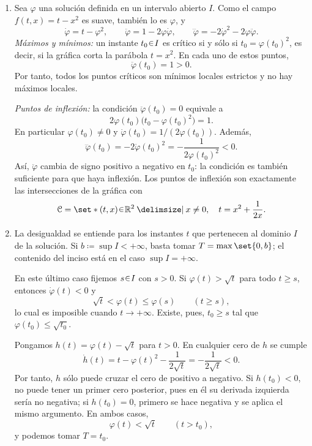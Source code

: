 \begin{sol}
\begin{enumerate}[label = (\alph*)]
    \item Sea $\varphi$ una solución definida en un intervalo abierto $I$. Como el campo $f(t,x)=t-x^2$ es suave, también lo es $\varphi$, y
    \[
        \dot\varphi=t-\varphi^2,\qquad
        \ddot\varphi=1-2\varphi\dot\varphi,\qquad
        \dddot\varphi=-2\dot\varphi^2-2\varphi\ddot\varphi.
    \]
    \emph{Máximos y mínimos:}
    un instante $t_0\en I$ es crítico si y sólo si $t_0=\varphi(t_0)^2$, es decir, si la gráfica corta la parábola $t=x^2$. En cada uno de estos puntos,
    \[
        \ddot\varphi(t_0)=1>0.
    \]
    Por tanto, todos los puntos críticos son mínimos locales estrictos y no hay máximos locales.

    \emph{Puntos de inflexión:}
    la condición $\ddot\varphi(t_0)=0$ equivale a
    \[
        2\varphi(t_0)\big(t_0-\varphi(t_0)^2\big)=1.
    \]
    En particular $\varphi(t_0)\neq0$ y $\dot\varphi(t_0)=1/(2\varphi(t_0))$. Además,
    \[
        \dddot\varphi(t_0)
        =-2\dot\varphi(t_0)^2
        =-\frac{1}{2\varphi(t_0)^2}<0.
    \]
    Así, $\ddot\varphi$ cambia de signo positivo a negativo en $t_0$: la condición es también suficiente para que haya inflexión. Los puntos de inflexión son exactamente las intersecciones de la gráfica con
    \[
        \mathcal C=\set*{(t,x)\en\mathbb R^2
            \given x\neq0,\quad t=x^2+\frac{1}{2x}}.
    \]

    \item La desigualdad se entiende para los instantes $t$ que pertenecen al dominio $I$ de la solución. Si $b\coloneq\sup I<+\infty$, basta tomar $T=\max\set{0,b}$; el contenido del inciso está en el caso $\sup I=+\infty$.

    En este último caso fijemos $s\en I$ con $s>0$. Si $\varphi(t)>\sqrt t$ para todo $t\geq s$, entonces $\dot\varphi(t)<0$ y
    \[
        \sqrt t<\varphi(t)\leq\varphi(s)\qquad(t\geq s),
    \]
    lo cual es imposible cuando $t\to+\infty$. Existe, pues, $t_0\geq s$ tal que $\varphi(t_0)\leq\sqrt{t_0}$.

    Pongamos $h(t)=\varphi(t)-\sqrt t$ para $t>0$. En cualquier cero de $h$ se cumple
    \[
        \dot h(t)=t-\varphi(t)^2-\frac{1}{2\sqrt t}
        =-\frac{1}{2\sqrt t}<0.
    \]
    Por tanto, $h$ sólo puede cruzar el cero de positivo a negativo. Si $h(t_0)<0$, no puede tener un primer cero posterior, pues en él su derivada izquierda sería no negativa; si $h(t_0)=0$, primero se hace negativa y se aplica el mismo argumento. En ambos casos,
    \[
        \varphi(t)<\sqrt t\qquad(t>t_0),
    \]
    y podemos tomar $T=t_0$.


\end{enumerate}
\end{sol}
